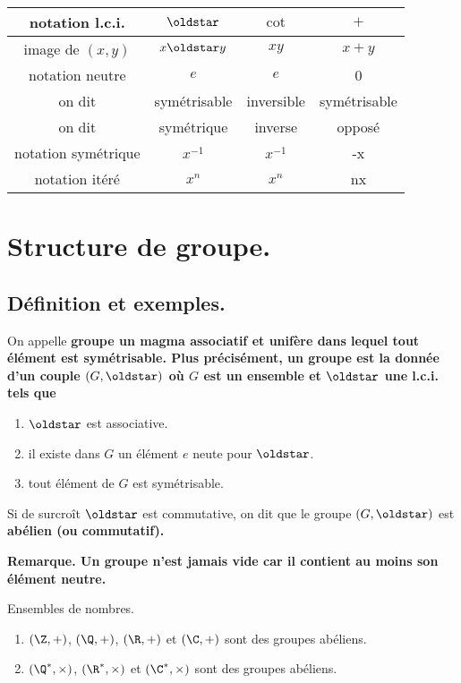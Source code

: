 \documentclass[11pt]{article}
\begin{document}
\begin{center}
    \begin{tabular}{|c|c|c|c|}
        \hline
        notation l.c.i. & $\s$ & $\cot$ & $+$\\
        \hline
        image de $(x,y)$ & $x\s y$ & $xy$ & $x+y$\\
        \hline
        notation neutre & $e$ & $e$ & 0\\
        \hline
        on dit & symétrisable & inversible & symétrisable\\
        \hline
        on dit & symétrique & inverse & opposé\\
        \hline
        notation symétrique & $x^{-1}$ & $x^{-1}$ & -x\\
        \hline
        notation itéré & $x^n$ & $x^n$ & nx\\
        \hline
    \end{tabular}
\end{center}

\section{Structure de groupe.} 

\subsection{Définition et exemples.}

\begin{defi}{}{}
    On appelle \bf{groupe} un magma associatif et unifère dans lequel tout élément est symétrisable.\n
    Plus précisément, un groupe est la donnée d'un couple $(G,\s)$ où $G$ est un ensemble et $\s$ une l.c.i. tels que
    \begin{enumerate}
        \item $\s$ est associative.
        \item il existe dans $G$ un élément $e$ neute pour $\s$.
        \item tout élément de $G$ est symétrisable.
    \end{enumerate}
    Si de surcroît $\s$ est commutative, on dit que le groupe $(G,\s)$ est \bf{abélien} (ou commutatif).
\end{defi}

\bf{Remarque.} Un groupe n'est jamais vide car il contient au moins son élément neutre.

\begin{prop}{Ensembles de nombres.}{}
    \begin{enumerate}
        \item $(\Z,+)$, $(\Q,+)$, $(\R,+)$ et $(\C,+)$ sont des groupes abéliens.
        \item $(\Q^*, \times)$, $(\R^*, \times)$ et $(\C^*, \times)$ sont des groupes abéliens.
    \end{enumerate}
\end{prop}
\end{document}
